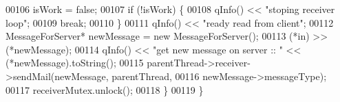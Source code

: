 \begin{DoxyCode}
00106       isWork = \textcolor{keyword}{false};
00107     \textcolor{keywordflow}{if} (!isWork) \{
00108       qInfo() << \textcolor{stringliteral}{"stoping receiver loop"};
00109       \textcolor{keywordflow}{break};
00110     \}
00111     qInfo() << \textcolor{stringliteral}{"ready read from client"};
00112     MessageForServer* newMessage = \textcolor{keyword}{new} MessageForServer();
00113     (*in) >> (*newMessage);
00114     qInfo() << \textcolor{stringliteral}{"get new message on server :: "} << (*newMessage).toString();
00115     parentThread->receiver->sendMail(newMessage, parentThread,
00116                                      newMessage->messageType);
00117     receiverMutex.unlock();
00118   \}
00119 \}
\end{DoxyCode}
